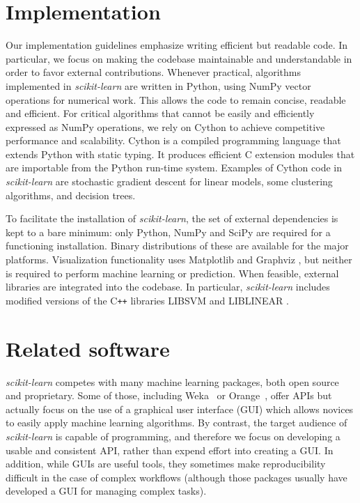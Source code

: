 \documentclass[twocolumn]{article}
\newcommand{\sklearn}{\textit{scikit-learn}\xspace}
\begin{document}
\section{Implementation}
\label{sec:implementation}

Our implementation guidelines emphasize writing efficient but readable code.
In particular, we focus on making the codebase maintainable and
understandable in order to favor external contributions. Whenever practical,
algorithms implemented in \sklearn are written in Python,
using NumPy vector operations for numerical work.
This allows the code to remain concise, readable and efficient.
For critical algorithms that cannot be easily and efficiently
expressed as NumPy operations, we rely on Cython \citep{behnel2011cython}
to achieve competitive performance and scalability. Cython is a
compiled programming language that extends Python with static typing. It
produces efficient C extension modules that are importable from the
Python run-time system. Examples of Cython code in \sklearn are
stochastic gradient descent for linear models, some clustering
algorithms, and decision trees.

To facilitate the installation of \sklearn,
the set of external dependencies is kept to a bare minimum:
only Python, NumPy and SciPy are required for a functioning installation.
Binary distributions of these are available for the major platforms.
Visualization functionality uses Matplotlib \citep{hunter2007matplotlib}
and Graphviz \citep{gansner2000},
but neither is required to perform machine learning or prediction.
When feasible, external libraries are integrated into the codebase.
In particular, \sklearn includes modified versions of the C{}\verb!++! libraries
\textsf{LIBSVM} and \textsf{LIBLINEAR} \citep{chang2011libsvm,fan2008}.

\section{Related software}
\label{sec:comparison}

\sklearn competes with many machine learning packages,
both open source and proprietary.
Some of those, including Weka~\citep{hall2009weka} or
Orange~\citep{Demsar2004}, offer APIs but actually focus on the use of a graphical user interface (GUI)
which allows novices to easily apply machine learning algorithms. By
contrast, the target audience of \sklearn is capable of programming, and
therefore we focus on developing a usable and consistent API, rather than expend
effort into creating a GUI\@. In addition, while GUIs are useful tools, they
sometimes make reproducibility difficult in the case of complex workflows
(although those packages usually have developed a GUI for managing complex
tasks).
\end{document}
